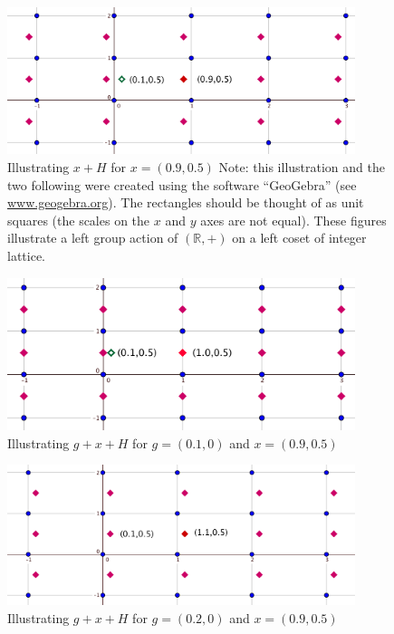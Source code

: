 \begin{figure}[ht]
\begin{center}
\includegraphics[width=4.0in]{images/IntLat1.png}
\caption{Illustrating $x+H$ for $x=(0.9,0.5)$ Note: this illustration and the two following were created using the software ``GeoGebra'' (see \url{www.geogebra.org}).  
The rectangles should be thought of as unit squares (the scales on the $x$ and $y$ axes are not equal).   These figures illustrate a left group action of $(\mathbb{R},+)$ on a left coset of integer lattice.}
\label{fig:IntegerLattice1}
\end{center}
\end{figure}

\begin{figure}[ht]
\begin{center}
\includegraphics[width=4.0in]{images/IntLat2.png}
\caption{Illustrating $g+x+H$ for $g=(0.1,0)$ and $x=(0.9,0.5)$}
\label{fig:IntegerLattice2}
\end{center}
\end{figure}


\begin{figure}[ht]
\begin{center}
\includegraphics[width=4.0in]{images/IntLat3.png}
\caption{Illustrating $g+x+H$ for $g=(0.2,0)$ and $x=(0.9,0.5)$}
\label{fig:IntegerLattice3}
\end{center}
\end{figure}


